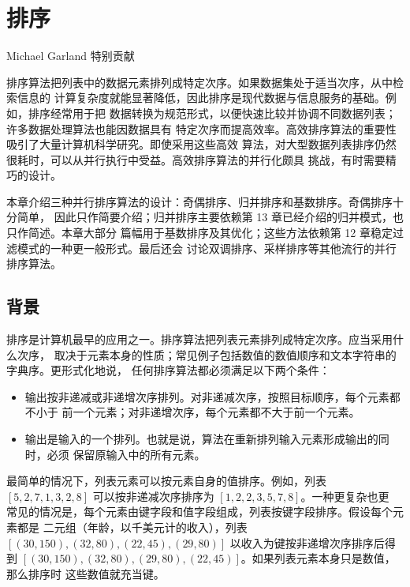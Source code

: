 \chapter{排序}
\label{chap:sorting}
\chaptercontents

\setcounter{footnote}{0}

\begin{flushright}
  \small Michael Garland 特别贡献
\end{flushright}

排序算法把列表中的数据元素排列成特定次序。如果数据集处于适当次序，从中检索信息的
计算复杂度就能显著降低，因此排序是现代数据与信息服务的基础。例如，排序经常用于把
数据转换为规范形式，以便快速比较并协调不同数据列表；许多数据处理算法也能因数据具有
特定次序而提高效率。高效排序算法的重要性吸引了大量计算机科学研究。即使采用这些高效
算法，对大型数据列表排序仍然很耗时，可以从并行执行中受益。高效排序算法的并行化颇具
挑战，有时需要精巧的设计。

本章介绍三种并行排序算法的设计：奇偶排序、归并排序和基数排序。奇偶排序十分简单，
因此只作简要介绍；归并排序主要依赖第 13 章已经介绍的归并模式，也只作简述。本章大部分
篇幅用于基数排序及其优化；这些方法依赖第 12 章稳定过滤模式的一种更一般形式。最后还会
讨论双调排序、采样排序等其他流行的并行排序算法。

\section{背景}
\label{sec:sorting-background}

排序是计算机最早的应用之一。排序算法把列表元素排列成特定次序。应当采用什么次序，
取决于元素本身的性质；常见例子包括数值的数值顺序和文本字符串的字典序。更形式化地说，
任何排序算法都必须满足以下两个条件：

\begin{itemize}
  \item 输出按非递减或非递增次序排列。对非递减次序，按照目标顺序，每个元素都不小于
  前一个元素；对非递增次序，每个元素都不大于前一个元素。
  \item 输出是输入的一个排列。也就是说，算法在重新排列输入元素形成输出的同时，必须
  保留原输入中的所有元素。
\end{itemize}

最简单的情况下，列表元素可以按元素自身的值排序。例如，列表
$[5,2,7,1,3,2,8]$ 可以按非递减次序排序为 $[1,2,2,3,5,7,8]$。一种更复杂也更
常见的情况是，每个元素由键字段和值字段组成，列表按键字段排序。假设每个元素都是
二元组（年龄，以千美元计的收入），列表
$[(30,150),(32,80),(22,45),(29,80)]$ 以收入为键按非递增次序排序后得到
$[(30,150),(32,80),(29,80),(22,45)]$。如果列表元素本身只是数值，那么排序时
这些数值就充当键。

